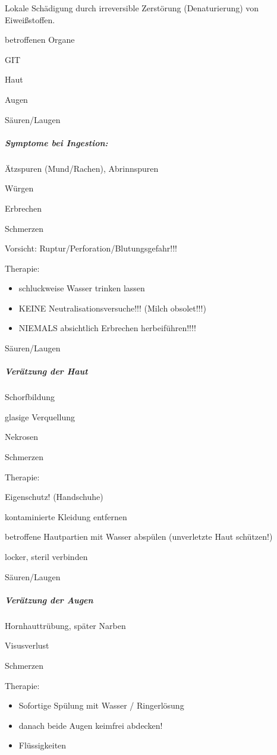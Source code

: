 \documentclass{article}
\begin{document}
Lokale Sch\"adigung durch irreversible Zerst\"orung (Denaturierung) von
Eiwei{\ss}stoffen. 

betroffenen Organe

GIT

Haut

Augen

S\"auren/Laugen

\subparagraph{Symptome bei Ingestion:}
\"Atzspuren (Mund/Rachen), Abrinnspuren

W\"urgen

Erbrechen

Schmerzen

Vorsicht: Ruptur/Perforation/Blutungsgefahr!!!

Therapie:

\begin{itemize}
\item schluckweise Wasser trinken lassen

\item KEINE Neutralisationsversuche!!! (Milch  obsolet!!!)

\item NIEMALS absichtlich Erbrechen  herbeif\"uhren!!!!

\end{itemize}
S\"auren/Laugen

\subparagraph{Ver\"atzung der Haut}
Schorfbildung

glasige Verquellung

Nekrosen

Schmerzen

Therapie:

Eigenschutz! (Handschuhe)

kontaminierte Kleidung entfernen

betroffene Hautpartien mit Wasser absp\"ulen  (unverletzte Haut
sch\"utzen!)

locker, steril verbinden

S\"auren/Laugen

\subparagraph{Ver\"atzung der Augen}
Hornhauttr\"ubung, sp\"ater Narben

Visusverlust

Schmerzen

Therapie:

\begin{itemize}
\item Sofortige Sp\"ulung mit Wasser / Ringerl\"osung

\item danach beide Augen keimfrei abdecken!

\item Fl\"ussigkeiten

\end{itemize}
\end{document}
